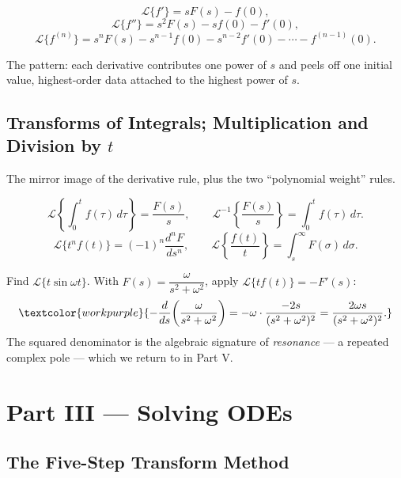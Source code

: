 \begin{formulabox}
\[ \mathcal{L}\{f'\} = sF(s) - f(0), \]
\[ \mathcal{L}\{f''\} = s^2 F(s) - s f(0) - f'(0), \]
\[ \mathcal{L}\{f^{(n)}\} = s^n F(s) - s^{n-1} f(0) - s^{n-2} f'(0) - \cdots - f^{(n-1)}(0). \]
\end{formulabox}

The pattern: each derivative contributes one power of $s$ and peels off one initial
value, highest-order data attached to the highest power of $s$.

\subsection{Transforms of Integrals; Multiplication and Division by $t$}

The mirror image of the derivative rule, plus the two ``polynomial weight'' rules.

\begin{formulabox}
\[ \mathcal{L}\!\left\{ \int_0^t f(\tau)\,d\tau \right\} = \frac{F(s)}{s}, \qquad
   \mathcal{L}^{-1}\!\left\{\frac{F(s)}{s}\right\} = \int_0^t f(\tau)\,d\tau. \]
\[ \mathcal{L}\{t^n f(t)\} = (-1)^n \frac{d^n F}{ds^n}, \qquad
   \mathcal{L}\!\left\{\frac{f(t)}{t}\right\} = \int_s^\infty F(\sigma)\,d\sigma. \]
\end{formulabox}

\begin{examplebox}
Find $\mathcal{L}\{t\sin\omega t\}$. With $F(s)=\dfrac{\omega}{s^2+\omega^2}$,
apply $\mathcal{L}\{t f(t)\} = -F'(s)$:
\[ \textcolor{workpurple}{-\frac{d}{ds}\!\left(\frac{\omega}{s^2+\omega^2}\right)
   = -\omega \cdot \frac{-2s}{(s^2+\omega^2)^2}
   = \frac{2\omega s}{(s^2+\omega^2)^2}.} \]
The squared denominator is the algebraic signature of \emph{resonance} --- a
repeated complex pole --- which we return to in Part V.
\end{examplebox}

\clearpage
{}
{}
\section*{Part III --- Solving ODEs}

\subsection{The Five-Step Transform Method}

